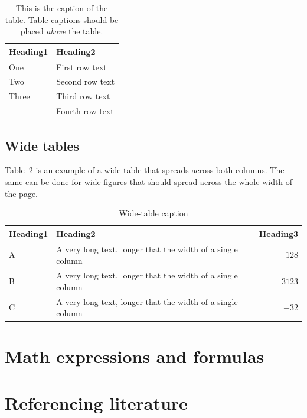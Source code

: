 \documentclass[10pt, a4paper]{article}
\begin{document}
\begin{table}
\caption{This is the caption of the table. Table captions should be placed \textit{above} the table.}
\label{tab:narrow-table}
\begin{center}
\begin{tabular}{ll}
\toprule
Heading1 & Heading2 \\
\midrule
One & First row text \\
Two   & Second row text \\
Three   & Third row text \\
      & Fourth row text \\
\bottomrule
\end{tabular}
\end{center}
\end{table}

\subsection{Wide tables}

Table~\ref{tab:wide-table} is an example of a wide table that spreads across both columns. The same can be done for wide figures that should spread across the whole width of the page. 

\begin{table}
\caption{Wide-table caption}
\label{tab:wide-table}
\begin{center}
\begin{tabular}{llr}
\toprule
Heading1 & Heading2 & Heading3\\
\midrule
A & A very long text, longer that the width of a single column & $128$\\
B & A very long text, longer that the width of a single column & $3123$\\
C & A very long text, longer that the width of a single column & $-32$\\
\bottomrule
\end{tabular}
\end{center}
\end{table}

\section{Math expressions and formulas}



\section{Referencing literature}
\end{document}
